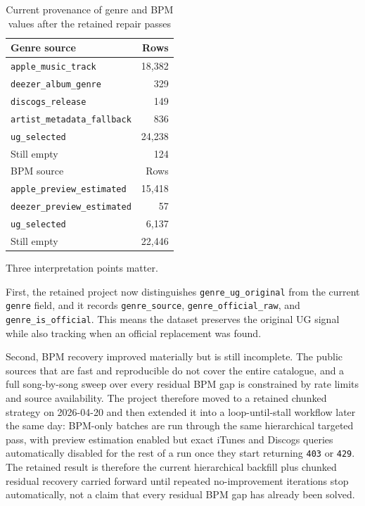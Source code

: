 \documentclass[11pt]{article}
\begin{document}
\begin{table}[H]
\centering
\caption{Current provenance of genre and BPM values after the retained repair passes}
\begin{tabularx}{\textwidth}{Y r}
\toprule
Genre source & Rows \\
\midrule
\texttt{apple\_music\_track} & 18,382 \\
\texttt{deezer\_album\_genre} & 329 \\
\texttt{discogs\_release} & 149 \\
\texttt{artist\_metadata\_fallback} & 836 \\
\texttt{ug\_selected} & 24,238 \\
Still empty & 124 \\
\midrule
BPM source & Rows \\
\midrule
\texttt{apple\_preview\_estimated} & 15,418 \\
\texttt{deezer\_preview\_estimated} & 57 \\
\texttt{ug\_selected} & 6,137 \\
Still empty & 22,446 \\
\bottomrule
\end{tabularx}
\end{table}

Three interpretation points matter.

First, the retained project now distinguishes \texttt{genre\_ug\_original} from
the current \texttt{genre} field, and it records \texttt{genre\_source},
\texttt{genre\_official\_raw}, and \texttt{genre\_is\_official}. This means the
dataset preserves the original UG signal while also tracking when an official
replacement was found.

Second, BPM recovery improved materially but is still incomplete. The public
sources that are fast and reproducible do not cover the entire catalogue, and a
full song-by-song sweep over every residual BPM gap is constrained by rate
limits and source availability. The project therefore moved to a retained
chunked strategy on 2026-04-20 and then extended it into a loop-until-stall
workflow later the same day: BPM-only batches are run through the same
hierarchical targeted pass, with preview estimation enabled but exact iTunes
and Discogs queries automatically disabled for the rest of a run once they
start returning \texttt{403} or \texttt{429}. The retained result is therefore
the current hierarchical backfill plus chunked residual recovery carried
forward until repeated no-improvement iterations stop automatically, not a
claim that every residual BPM gap has already been solved.
\end{document}
